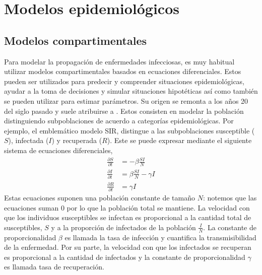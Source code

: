 \chapter{Modelos epidemiológicos}

\section{Modelos compartimentales}

Para modelar la propagación de enfermedades infecciosas, es muy habitual utilizar modelos compartimentales basados en ecuaciones diferenciales. Estos pueden ser utilizados para predecir y comprender situaciones epidemiológicas, ayudar a la toma de decisiones y simular situaciones hipotéticas así como también se pueden utilizar para estimar parámetros. Su origen se remonta a los años 20 del siglo pasado y suele atribuirse a \cite{Kermack1927}. Estos consisten en modelar la población distinguiendo subpoblaciones de acuerdo a categorías epidemiológicas. Por ejemplo, el emblemático modelo SIR, distingue a las subpoblaciones susceptible ($S$), infectada ($I$) y recuperada ($R$). Este se puede expresar mediante el siguiente sistema de ecuaciones diferenciales,
\begin{align}
    \frac{\partial S}{\partial t} &= -\beta \frac{SI}{N}\\
    \frac{\partial I}{\partial t} &= \beta \frac{SI}{N} - \gamma I \\
    \frac{\partial R}{\partial t} &= \gamma I
\end{align}
Estas ecuaciones suponen una población constante de tamaño $N$: notemos que las ecuaciones suman 0 por lo que la población total se mantiene. La velocidad con que los individuos susceptibles se infectan es proporcional a la cantidad total de susceptibles, $S$ y a la proporción de infectados de la población $\frac{I}{N}$. La constante de proporcionalidad $\beta$ es llamada la tasa de infección y cuantifica la transmisibilidad de la enfermedad. Por su parte, la velocidad con que los infectados se recuperan es proporcional a la cantidad de infectados y la constante de proporcionalidad $\gamma$ es llamada tasa de recuperación.

